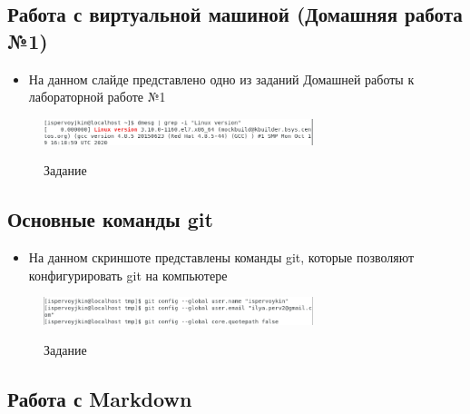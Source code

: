 \subsection{Работа с виртуальной машиной (Домашняя работа
№1)}\label{ux440ux430ux431ux43eux442ux430-ux441-ux432ux438ux440ux442ux443ux430ux43bux44cux43dux43eux439-ux43cux430ux448ux438ux43dux43eux439-ux434ux43eux43cux430ux448ux43dux44fux44f-ux440ux430ux431ux43eux442ux430-1}

\begin{itemize}
\tightlist
\item
  На данном слайде представлено одно из заданий Домашней работы к
  лабораторной работе №1
\end{itemize}

\begin{figure}
\label{fig:003}
\centering
\includegraphics[width=0.7\textwidth,height=\textheight]{image/3.png}
\caption{Задание}\label{fig:003}
\end{figure}

\subsection{Основные команды
git}\label{ux43eux441ux43dux43eux432ux43dux44bux435-ux43aux43eux43cux430ux43dux434ux44b-git}

\begin{itemize}
\tightlist
\item
  На данном скриншоте представлены команды git, которые позволяют
  конфигурировать git на компьютере
\end{itemize}

\begin{figure}
\label{fig:004}
\centering
\includegraphics[width=0.7\textwidth,height=\textheight]{image/4.png}
\caption{Задание}\label{fig:004}
\end{figure}

\subsection{Работа с
Markdown}\label{ux440ux430ux431ux43eux442ux430-ux441-markdown}

